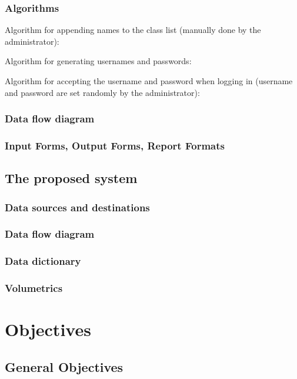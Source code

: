 \subsubsection{Algorithms}

Algorithm for appending names to the class list (manually done by the administrator):



Algorithm for generating usernames and passwords:

Algorithm for accepting the username and password when logging in (username and password are set randomly by the administrator):

\subsubsection{Data flow diagram}

\subsubsection{Input Forms, Output Forms, Report Formats}

\subsection{The proposed system}

\subsubsection{Data sources and destinations}

\subsubsection{Data flow diagram}

\subsubsection{Data dictionary}

\subsubsection{Volumetrics}

\section{Objectives}

\subsection{General Objectives}

